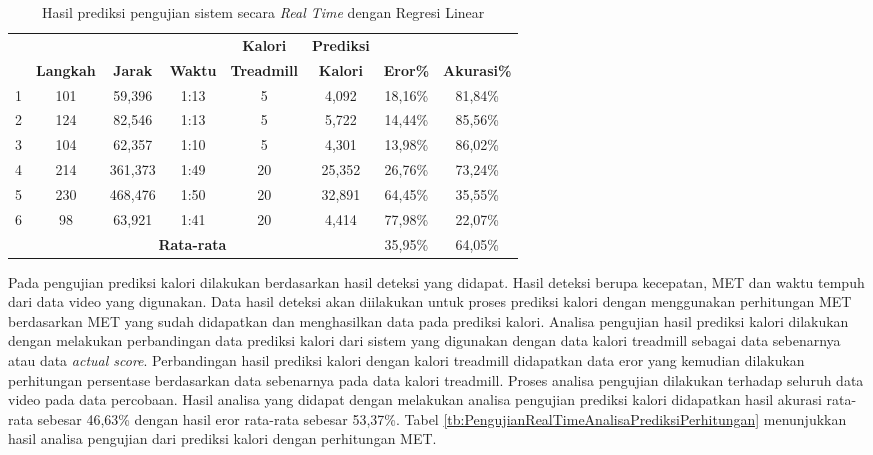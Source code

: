 \begin{longtable}{|c|c|c|c|c|c|c|c|}
  \caption{Hasil prediksi pengujian sistem secara \emph{Real Time} dengan Regresi Linear}
  \label{tb:PengujianRealTimeAnalisaPrediksiRegresi}                                   \\
  \hline
  \rowcolor[HTML]{C0C0C0}
  & & & & \textbf{Kalori} & \textbf{Prediksi} & & \\
  \rowcolor[HTML]{C0C0C0}
  \multirow{-2}{*}{\textbf{Percobaan}} & \multirow{-2}{*}{\textbf{Langkah}} & \multirow{-2}{*}{\textbf{Jarak}} & \multirow{-2}{*}{\textbf{Waktu}} & \textbf{Treadmill} & \textbf{Kalori} & \multirow{-2}{*}{\textbf{Eror\%}} & \multirow{-2}{*}{\textbf{Akurasi\%}} \\
  
  \hline 
  1   & 101   & 59,396     & 1:13    & 5    & 4,092    & 18,16\%      & 81,84\%   \\
  \hline  
  2   & 124   & 82,546     & 1:13    & 5    & 5,722    & 14,44\%      & 85,56\%  \\
  \hline
  3   & 104   & 62,357     & 1:10    & 5    & 4,301    & 13,98\%      & 86,02\%   \\
  \hline
  4   & 214   & 361,373    & 1:49    & 20    & 25,352  & 26,76\%      & 73,24\%  \\
  \hline
  5   & 230   & 468,476    & 1:50    & 20    & 32,891  & 64,45\%      & 35,55\%    \\
  \hline
  6   & 98    & 63,921     & 1:41    & 20    & 4,414   & 77,98\%      & 22,07\%   \\
  \hline

  \multicolumn{6}{|c|}{\textbf{Rata-rata}} & 35,95\% & 64,05\% \\
  \hline
\end{longtable}

Pada pengujian prediksi kalori dilakukan berdasarkan hasil deteksi yang didapat. Hasil deteksi berupa kecepatan, MET dan waktu tempuh dari data video yang digunakan. Data hasil deteksi akan diilakukan untuk proses prediksi kalori dengan menggunakan perhitungan MET berdasarkan MET yang sudah didapatkan dan menghasilkan data pada prediksi kalori. Analisa pengujian hasil prediksi kalori dilakukan dengan melakukan perbandingan data prediksi kalori dari sistem yang digunakan dengan data kalori treadmill sebagai data sebenarnya atau data \emph{actual score}. Perbandingan hasil prediksi kalori dengan kalori treadmill didapatkan data eror yang kemudian dilakukan perhitungan persentase berdasarkan data sebenarnya pada data kalori treadmill. Proses analisa pengujian dilakukan terhadap seluruh data video pada data percobaan. Hasil analisa yang didapat dengan melakukan analisa pengujian prediksi kalori didapatkan hasil akurasi rata-rata sebesar 46,63\% dengan hasil eror rata-rata sebesar 53,37\%. Tabel \ref{tb:PengujianRealTimeAnalisaPrediksiPerhitungan} menunjukkan hasil analisa pengujian dari prediksi kalori dengan perhitungan MET.

